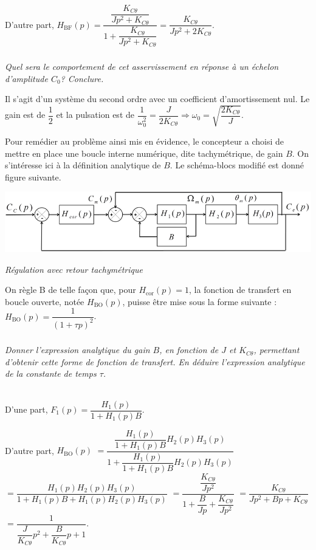 \documentclass[10pt,fleqn]{article} %
\begin{document}
\begin{multicols}{2}
\begin{corrige}
D'autre part, $H_{\text{BF}}(p)
=\dfrac{\dfrac{K_{C\theta}}{Jp^2+K_{C\theta}}}{1+\dfrac{K_{C\theta}}{Jp^2+K_{C\theta}}}=\dfrac{K_{C\theta}}{Jp^2+2K_{C\theta}}$.

\end{corrige}
\else
\fi

\subparagraph{}
\textit{Quel sera le comportement de cet asservissement en réponse à un échelon d'amplitude $C_0$?
Conclure.}
\ifprof
\begin{corrige}
Il s'agit d'un système du second ordre avec un coefficient d'amortissement nul. Le gain est de $\dfrac{1}{2}$ et la pulsation est de $\dfrac{1}{\omega_0^2}=\dfrac{J}{2K_{C\theta}} \Rightarrow \omega_0=\sqrt{\dfrac{2K_{C\theta}}{J}}$.
\end{corrige}
\else
\fi


\ifprof
\else
Pour remédier au problème ainsi mis en évidence, le concepteur a choisi de mettre en place une boucle
interne numérique, dite tachymétrique, de gain $B$. On s’intéresse ici à la définition analytique de $B$.
Le schéma-blocs modifié est donné figure suivante.


\begin{center}
\includegraphics[width=\linewidth]{images/Sujet/images/fig_07}

\textit{Régulation avec retour tachymétrique}
\end{center}


On règle B de telle façon que, pour $H_{\text{cor}}(p)=1$, la fonction de transfert en boucle ouverte, notée $H_{\text{BO}}(p)$, puisse être mise sous la forme suivante : 
$H_{\text{BO}}(p)=\dfrac{1}{\left(1+\tau p\right)^2}$.

\fi

\subparagraph{}
\textit{Donner l’expression analytique du gain $B$, en fonction de $J$ et $K_{C\theta}$, permettant d’obtenir cette
forme de fonction de transfert. En déduire l’expression analytique de la constante de temps $\tau$.}
\ifprof
\begin{corrige}~\\

D'une part, $F_1(p)=\dfrac{H_1(p)}{1+H_1(p)B}$. 

D'autre part, 
$H_{\text{BO}}(p)$
$=\dfrac{\dfrac{H_1(p)}{1+H_1(p)B}H_2(p)H_3(p)}{1+\dfrac{H_1(p)}{1+H_1(p)B}H_2(p)H_3(p)}$ 
$=\dfrac{H_1(p)H_2(p)H_3(p)}{1+H_1(p)B+H_1(p)H_2(p)H_3(p)}$
$=\dfrac{\dfrac{K_{C\theta}}{Jp^2}}{1+\dfrac{B}{Jp}+\dfrac{K_{C\theta}}{Jp^2}}$
$=\dfrac{K_{C\theta}}{Jp^2+Bp+K_{C\theta}}$
$=\dfrac{1}{\dfrac{J}{K_{C\theta}}p^2+\dfrac{B}{K_{C\theta}}p+1}$.


\end{corrige}
\end{multicols}
\end{document}
